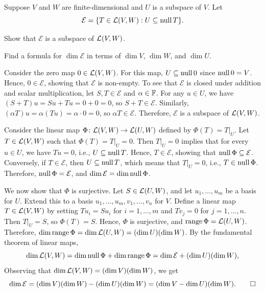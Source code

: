 \begin{exc}
\begin{exercise}
Suppose $V$ and $W$ are finite-dimensional and $U$ is a subspace of $V$. Let
\[ \mathcal{E} = \{T\in\Lin(V,W) : U\subseteq\nul T\}. \]
\begin{parts}
\item Show that $\mathcal{E}$ is a subspace of $\Lin(V,W)$.
\item Find a formula for $\dim\mathcal{E}$ in terms of $\dim V$, $\dim W$, and
  $\dim U$.
\end{parts}
\end{exercise}
\begin{solution}\leavevmode
\begin{parts}
\item Consider the zero map $0\in\Lin(V,W)$. For this map, $U\subseteq\nul 0$
  since $\nul 0=V$. Hence, $0\in\mathcal{E}$, showing that $\mathcal{E}$ is
  non-empty. To see that $\mathcal{E}$ is closed under addition and scalar
  multiplication, let $S,T\in\mathcal{E}$ and $\alpha\in\F$. For any $u\in U$,
  we have $(S+T)u=Su+Tu=0+0=0$, so $S+T\in\mathcal{E}$. Similarly,
  $(\alpha T)u=\alpha(Tu)=\alpha\cdot0=0$, so $\alpha T\in\mathcal{E}$.
  Therefore, $\mathcal{E}$ is a subspace of $\Lin(V,W)$.
\item Consider the linear map $\Phi\colon\Lin(V,W)\to\Lin(U,W)$ defined by
  $\Phi(T)=T|_U$. Let $T\in\Lin(V,W)$ such that $\Phi(T)=T|_U=0$. Then
  $T|_U=0$ implies that for every $u\in U$, we have $Tu=0$, i.e.,
  $U\subseteq\nul T$. Hence, $T\in\mathcal{E}$, showing that
  $\nul\Phi\subseteq\mathcal{E}$. Conversely, if $T\in\mathcal{E}$, then
  $U\subseteq\nul T$, which means that $T|_U=0$, i.e., $T\in\nul\Phi$.
  Therefore, $\nul\Phi=\mathcal{E}$, and $\dim\mathcal{E}=\dim\nul\Phi$.

  We now show that $\Phi$ is surjective. Let $S\in\Lin(U,W)$, and let
  $u_1,\dots,u_m$ be a basis for $U$. Extend this to a basis
  $u_1,\dots,u_m,v_1,\dots,v_n$ for $V$. Define a linear map $T\in\Lin(V,W)$ by
  setting $Tu_i=Su_i$ for $i=1,\dots,m$ and $Tv_j=0$ for $j=1,\dots,n$. Then
  $T|_U=S$, so $\Phi(T)=S$. Hence, $\Phi$ is surjective, and
  $\range\Phi=\Lin(U,W)$. Therefore,
  $\dim\range\Phi=\dim\Lin(U,W)=(\dim U)(\dim W)$. By the fundamental theorem
  of linear maps,
  \[ \dim\Lin(V,W) = \dim\nul\Phi+\dim\range\Phi
     = \dim\mathcal{E}+(\dim U)(\dim W), \]
  Observing that $\dim\Lin(V,W)=(\dim V)(\dim W)$, we get
  \[ \dim\mathcal{E} = (\dim V)(\dim W)-(\dim U)(\dim W)
     = (\dim V-\dim U)(\dim W). \qedhere \]
\end{parts}
\end{solution}


\end{exc}
